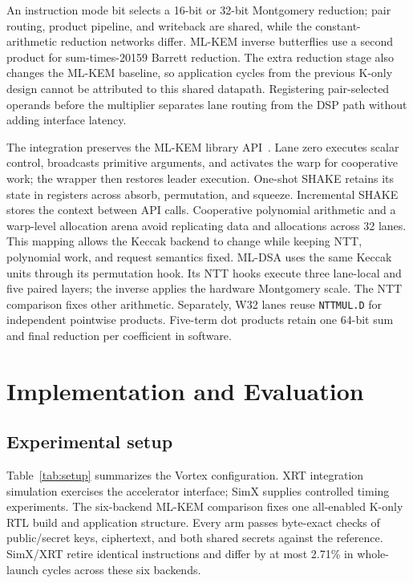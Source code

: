 \documentclass[conference,letterpaper]{IEEEtran}
\begin{document}
An instruction mode bit selects a 16-bit or 32-bit Montgomery reduction;
pair routing, product pipeline, and writeback are shared, while the
constant-arithmetic reduction networks differ. ML-KEM inverse butterflies
use a second product for sum-times-20159 Barrett reduction. The extra
reduction stage also changes the ML-KEM baseline, so application cycles from
the previous K-only design cannot be attributed to this shared datapath.
Registering pair-selected operands before the multiplier separates lane
routing from the DSP path without adding interface latency.

The integration preserves the ML-KEM library API~\cite{mlkemnative}.
Lane zero executes scalar control, broadcasts primitive arguments, and
activates the warp for cooperative work; the wrapper then restores leader
execution. One-shot SHAKE retains its state in registers across absorb,
permutation, and squeeze. Incremental SHAKE stores the context between
API calls. Cooperative polynomial arithmetic and a warp-level allocation
arena avoid replicating data and allocations across 32 lanes. This mapping
allows the Keccak backend to change while keeping NTT, polynomial work,
and request semantics fixed.
ML-DSA uses the same Keccak units through its permutation hook. Its NTT
hooks execute three lane-local and five paired layers; the inverse applies
the hardware Montgomery scale. The NTT comparison fixes other arithmetic.
Separately, W32 lanes reuse \texttt{NTTMUL.D} for independent pointwise
products. Five-term dot products retain one 64-bit sum and final reduction
per coefficient in software.

\section{Implementation and Evaluation}
\subsection{Experimental setup}
Table~\ref{tab:setup} summarizes the Vortex configuration. XRT integration
simulation exercises the accelerator interface; SimX supplies controlled
timing experiments. The six-backend ML-KEM comparison fixes one all-enabled
K-only RTL build and application structure. Every arm passes byte-exact
checks of public/secret keys, ciphertext, and both shared secrets against
the reference. SimX/XRT retire identical instructions and differ by at most
2.71\% in whole-launch cycles across these six backends.
\end{document}
